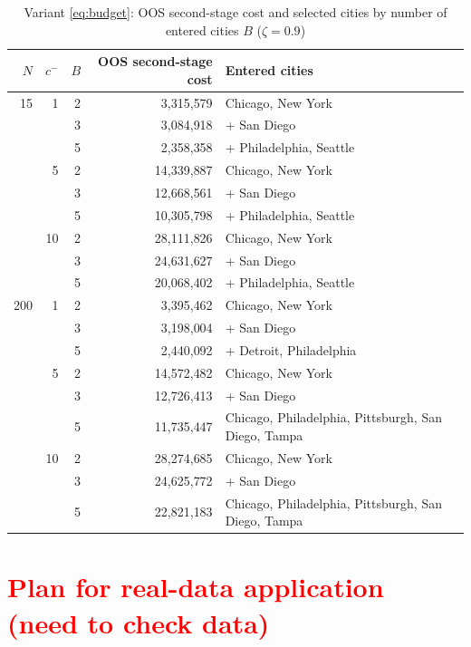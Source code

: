 \documentclass[10pt,a4paper]{article}
\begin{document}
\begin{table}[H]\centering\small
\caption{Variant \eqref{eq:budget}: OOS second-stage cost and selected cities by number of entered cities $B$ ($\zeta=0.9$)}\label{tab:budget}
\begin{tabular}{@{}rrrrl@{}}
\toprule
$N$ & $c^-$ & $B$ & OOS second-stage cost & Entered cities \\ \midrule
15  & 1  & 2 & 3{,}315{,}579 & Chicago, New York \\
    &    & 3 & 3{,}084{,}918 & + San Diego \\
    &    & 5 & 2{,}358{,}358 & + Philadelphia, Seattle \\
    & 5  & 2 & 14{,}339{,}887 & Chicago, New York \\
    &    & 3 & 12{,}668{,}561 & + San Diego \\
    &    & 5 & 10{,}305{,}798 & + Philadelphia, Seattle \\
    & 10 & 2 & 28{,}111{,}826 & Chicago, New York \\
    &    & 3 & 24{,}631{,}627 & + San Diego \\
    &    & 5 & 20{,}068{,}402 & + Philadelphia, Seattle \\ \midrule
200 & 1  & 2 & 3{,}395{,}462 & Chicago, New York \\
    &    & 3 & 3{,}198{,}004 & + San Diego \\
    &    & 5 & 2{,}440{,}092 & + Detroit, Philadelphia \\
    & 5  & 2 & 14{,}572{,}482 & Chicago, New York \\
    &    & 3 & 12{,}726{,}413 & + San Diego \\
    &    & 5 & 11{,}735{,}447 & Chicago, Philadelphia, Pittsburgh, San Diego, Tampa \\
    & 10 & 2 & 28{,}274{,}685 & Chicago, New York \\
    &    & 3 & 24{,}625{,}772 & + San Diego \\
    &    & 5 & 22{,}821{,}183 & Chicago, Philadelphia, Pittsburgh, San Diego, Tampa \\
\bottomrule
\end{tabular}
\end{table}

\clearpage

\section{\textcolor{red}{Plan for real-data application (need to check data)}}
\end{document}
